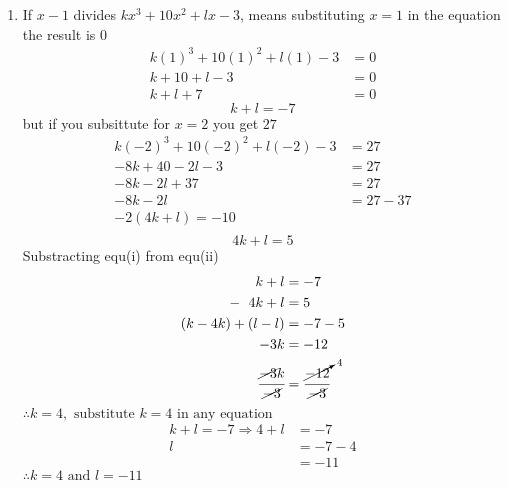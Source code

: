 \begin{multicols}{2}
\begin{enumerate}[label={\textbf{\arabic*.}}]
\item If $x-1$ divides $kx^3+10x^2+lx-3$, means substituting $x=1$ in the equation the result is $0$ 
    \begin{align*}
        k(1)^3+10(1)^2+l(1)-3 &= 0 \\
        k + 10 + l - 3 &= 0 \\
        k + l + 7 &= 0 
    \end{align*} 
    \begin{equation}\tag{i}
        k + l = -7
    \end{equation} \vspace{-5pt}
    but if you subsittute for $x = 2$ you get $27$ \\ \vspace{-10pt}
    \begin{align*}
        k(-2)^3 + 10(-2)^2 + l(-2) - 3 &= 27 \\
        -8k + 40 -2l -3 &= 27 \\
        -8k - 2l + 37 &= 27 \\
        -8k -2l &= 27 - 37 \\
        -2(4k + l) = -10 \\
    \end{align*}
    \begin{equation}\tag{ii} 
        4k + l = 5
    \end{equation}
    Substracting equ(i) from equ(ii)
    \begin{align*} 
        k + l &= -7 \\
       -\hspace{6pt} 4k + l  &= 5 \\
       (k - 4k ) + (l - l) & = -7 - 5  \\
       -3k & = -12 \\
       \cfrac{\cancel{-3}k}{\cancel{-3}} & = \cfrac{\cancelto{4}{-12}}{\cancel{-3}}
    \end{align*} 
    $\therefore k = 4, \text{ substitute } k = 4 \text{ in any equation }$ \\
    \begin{align*}
        k+l = -7 \Rightarrow 4 + l &= -7 \\
        l& = -7 -4 \\ &= -11
    \end{align*}
    $\therefore k = 4 \text{ and } l = -11$


\end{enumerate}
\end{multicols}
